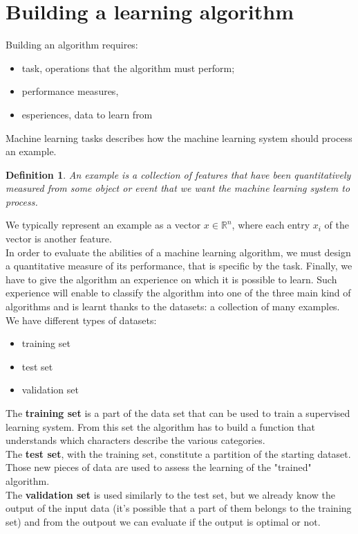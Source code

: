 \documentclass[a4paper,12pt]{report}
\begin{document}
\section{Building a learning algorithm}
Building an algorithm requires:
\begin{itemize}
\item task, operations that the algorithm must perform;
\item performance measures,
\item esperiences, data to learn from
\end{itemize}
Machine learning tasks describes how the machine learning system should process an example.
\newtheorem{defin}{Definition}
\begin{defin}
An example is a collection of features that have been quantitatively measured from some object or event that we want the machine learning system to process.
\end{defin}
We typically represent an example as a vector  $x\in \mathbb{R}^{n}$, where each entry  $x_{i}$ of the vector is another feature.\\
In order to evaluate the abilities of a machine learning algorithm, we must design a quantitative measure of its performance, that is specific by the task.
Finally, we have to give the algorithm an experience on which it is possible to learn. Such experience will enable to classify the algorithm into one of the three main kind of algorithms and is learnt thanks to the datasets: a collection of many examples. We have different types of datasets:\\
\begin{itemize}
\item training set
\item test set
\item validation set
\end{itemize}
The \textbf{training set} is a part of the data set that can be used to train a supervised learning system. From this set the algorithm has to build a function that understands which characters describe the various categories.\\
The \textbf{test set}, with the training set, constitute a partition of the starting dataset. Those new pieces of data are used to assess the learning of the "trained" algorithm.\\
The \textbf{validation set} is used similarly to the test set, but we already know the output of the input data (it's possible that a part of them belongs to the training set) and from the outpout we can evaluate if the output is optimal or not.\\
\end{document}
